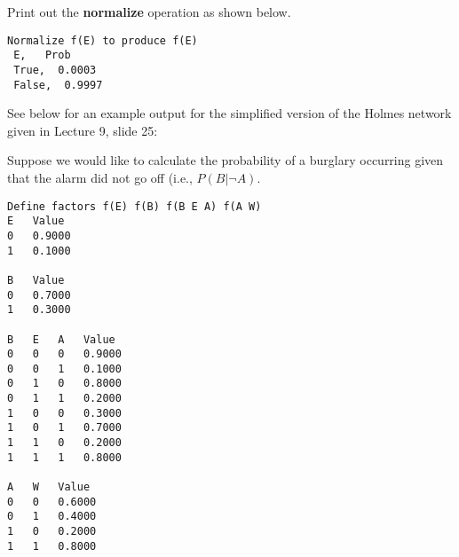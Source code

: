 \documentclass[12pt]{article}
\begin{document}
\begin{appendices}
Print out the {\bf normalize} operation as shown below.
%
\begin{verbatim}
Normalize f(E) to produce f(E)
 E,   Prob
 True,  0.0003
 False,  0.9997
\end{verbatim}


See below for an example output for the simplified version of the Holmes network given in Lecture 9, slide 25:

\begin{center}
\end{center}

Suppose we would like to calculate the probability of a burglary occurring given that the alarm did not go off (i.e., $P(B|\lnot A)$.

\begin{verbatim}
Define factors f(E) f(B) f(B E A) f(A W)
E	Value
0	0.9000
1	0.1000

B	Value
0	0.7000
1	0.3000

B	E	A	Value
0	0	0	0.9000
0	0	1	0.1000
0	1	0	0.8000
0	1	1	0.2000
1	0	0	0.3000
1	0	1	0.7000
1	1	0	0.2000
1	1	1	0.8000

A	W	Value
0	0	0.6000
0	1	0.4000
1	0	0.2000
1	1	0.8000



\end{verbatim}
\end{appendices}
\end{document}
